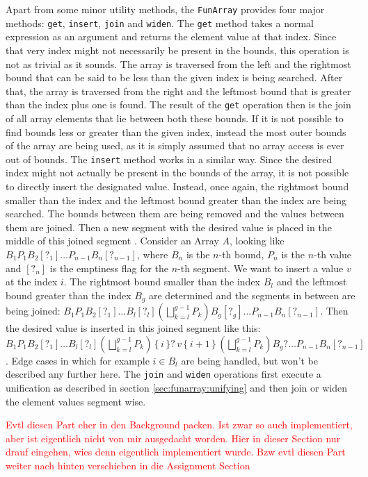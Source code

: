 Apart from some minor utility methods, the \texttt{FunArray} provides four major methods: \texttt{get}, \texttt{insert}, \texttt{join} and \texttt{widen}. The \texttt{get} method takes a normal expression as an argument and returns the element value at that index. Since that very index might not necessarily be present in the bounds, this operation is not as trivial as it sounds. The array is traversed from the left and the rightmost bound that can be said to be less than the given index is being searched. After that, the array is traversed from the right and the leftmost bound that is greater than the index plus one is found. The result of the \texttt{get} operation then is the join of all array elements that lie between both these bounds. If it is not possible to find bounds less or greater than the given index, instead the most outer bounds of the array are being used, as it is simply assumed that no array access is ever out of bounds. The \texttt{insert} method works in a similar way. Since the desired index might not actually be present in the bounds of the array, it is not possible to directly insert the designated value. Instead, once again, the rightmost bound smaller than the index and the leftmost bound greater than the index are being searched. The bounds between them are being removed and the values between them are joined. Then a new segment with the desired value is placed in the middle of this joined segment \cite{cousot2011} . Consider an Array $A$, looking like $B_1P_1B_2[?_1]\ldots P_{n-1}B_n[?_{n-1}]$, where $B_n$ is the $n$-th bound, $P_n$ is the $n$-th value and $[?_{n}]$ is the emptiness flag for the $n$-th segment. We want to insert a value $v$ at the index $i$. The rightmost bound smaller than the index $B_l$ and the leftmost bound greater than the index $B_g$ are determined and the segments in between are being joined: $B_1P_1B_2[?_1]\ldots B_l[?_l] (\bigsqcup^{g-1}_{k=l}P_k) B_g[?_g]\ldots P_{n-1}B_n[?_{n-1}]$. Then the desired value  is inserted in this joined segment like this: $B_1P_1B_2[?_1]\ldots\allowbreak B_l[?_l] (\bigsqcup^{g-1}_{k=l}P_k)\allowbreak\, \{\,i\,\}?\, v \,\{\,i+1\,\}\, \allowbreak(\bigsqcup^{g-1}_{k=l}P_k) B_g?\ldots \allowbreak P_{n-1}B_n[?_{n-1}]$. Edge cases in which for example $i\in B_l$ are being handled, but won't be described any further here. The \texttt{join} and \texttt{widen} operations first execute a unification as described in section \ref{sec:funarray:unifying} and then join or widen the element values segment wise.

\textcolor{red}{Evtl diesen Part eher in den Background packen. Ist zwar so auch implementiert, aber ist eigentlich nicht von mir ausgedacht worden. Hier in dieser Section nur drauf eingehen, wies denn eigentlich implementiert wurde. Bzw evtl diesen Part weiter nach hinten verschieben in die Assignment Section}

